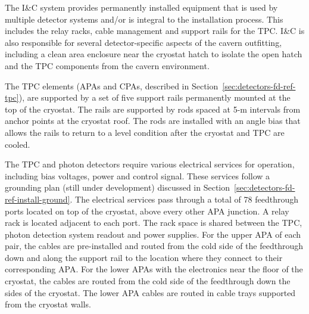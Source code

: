 The I\&C system provides 
permanently installed equipment that is used by multiple detector
systems and/or is integral to the installation process. This 
includes the relay racks, cable management and support rails for the TPC.
I\&C is also responsible for several detector-specific aspects of the cavern outfitting, including a clean area enclosure near the cryostat hatch to 
isolate  the open hatch and the TPC components
from the cavern environment. 



The TPC elements (APAs and CPAs, described in Section~\ref{sec:detectors-fd-ref-tpc}), are
supported by a set of five support rails permanently mounted at the
top of the cryostat. The rails are supported
by rods spaced at 5-m intervals from anchor points at the cryostat
roof. The rods are installed with an angle bias that allows the
rails to return to a level condition after the cryostat and TPC are
cooled. 

The TPC and photon detectors require various electrical services
for operation, including bias voltages, power and control signal. These services
follow a grounding plan (still under development) 
discussed in Section~\ref{sec:detectors-fd-ref-install-ground}.  The
electrical services pass through a total of 78 feedthrough ports located on top of the
cryostat, above every other APA junction.  A relay rack is located
adjacent to each port. The rack space is shared between the TPC,
photon detection system readout and power supplies. For the upper APA of each pair,
the cables are pre-installed and routed from the cold side of the
feedthrough down and along the support rail to the location where they
connect to their corresponding APA. For the lower APAs with the
electronics near the floor of the cryostat, the cables are routed
from the cold side of the feedthrough down the sides of the
cryostat. The lower APA cables are routed in cable trays supported
from the cryostat walls.

